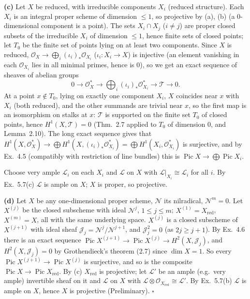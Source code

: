 \documentclass[11pt]{article}
\begin{document}
\textbf{(c)} Let $X$ be reduced, with irreducible components $X_i$ (reduced structure). Each $X_i$ is an integral proper scheme of dimension $\le1$, so projective by (a), (b) (a $0$-dimensional component is a point). The sets $X_i\cap X_j$ ($i\ne j$) are proper closed subsets of the irreducible $X_i$ of dimension $\le1$, hence finite sets of closed points; let $T_0$ be the finite set of points lying on at least two components. Since $X$ is reduced, $\mathcal O_X\to\bigoplus_i(\iota_i)_*\mathcal O_{X_i}$ ($\iota_i\colon X_i\to X$) is injective (an element vanishing in each $\mathcal O_{X_i}$ lies in all minimal primes, hence is $0$), so we get an exact sequence of sheaves of abelian groups
\[
0\to\mathcal O_X^*\to\bigoplus_i(\iota_i)_*\mathcal O_{X_i}^*\to\mathcal T\to0.
\]
At a point $x\notin T_0$, lying on exactly one component $X_i$, $X$ coincides near $x$ with $X_i$ (both reduced), and the other summands are trivial near $x$, so the first map is an isomorphism on stalks at $x$: $\mathcal T$ is supported on the finite set $T_0$ of closed points, hence $H^1(X,\mathcal T)=0$ (Thm.~2.7 applied to $T_0$ of dimension $0$, and Lemma~2.10). The long exact sequence gives that $H^1(X,\mathcal O_X^*)\to\bigoplus H^1(X,(\iota_i)_*\mathcal O_{X_i}^*)=\bigoplus H^1(X_i,\mathcal O^*_{X_i})$ is surjective, and by Ex.~4.5 (compatibly with restriction of line bundles) this is $\operatorname{Pic}X\to\bigoplus\operatorname{Pic}X_i$.

Choose very ample $\mathcal L_i$ on each $X_i$ and $\mathcal L$ on $X$ with $\mathcal L|_{X_i}\cong\mathcal L_i$ for all $i$. By Ex.~5.7(c) $\mathcal L$ is ample on $X$; $X$ is proper, so projective.

\textbf{(d)} Let $X$ be any one-dimensional proper scheme, $\mathcal N$ its nilradical, $\mathcal N^m=0$. Let $X^{(j)}$ be the closed subscheme with ideal $\mathcal N^j$, $1\le j\le m$; $X^{(1)}=X_{\mathrm{red}}$, $X^{(m)}=X$, all with the same underlying space. $X^{(j)}$ is a closed subscheme of $X^{(j+1)}$ with ideal sheaf $\mathcal J_j=\mathcal N^j/\mathcal N^{j+1}$, and $\mathcal J_j^2=0$ (as $2j\ge j+1$). By Ex.~4.6 there is an exact sequence $\operatorname{Pic}X^{(j+1)}\to\operatorname{Pic}X^{(j)}\to H^2(X,\mathcal J_j)$, and $H^2(X,\mathcal J_j)=0$ by Grothendieck's theorem (2.7) since $\dim X=1$. So every $\operatorname{Pic}X^{(j+1)}\to\operatorname{Pic}X^{(j)}$ is surjective, and so is the composite $\operatorname{Pic}X\to\operatorname{Pic}X_{\mathrm{red}}$. By (c) $X_{\mathrm{red}}$ is projective; let $\mathcal L'$ be an ample (e.g.\ very ample) invertible sheaf on it and $\mathcal L$ on $X$ with $\mathcal L\otimes\mathcal O_{X_{\mathrm{red}}}\cong\mathcal L'$. By Ex.~5.7(b) $\mathcal L$ is ample on $X$, hence $X$ is projective (Preliminary). \hfill$\square$
\end{document}
